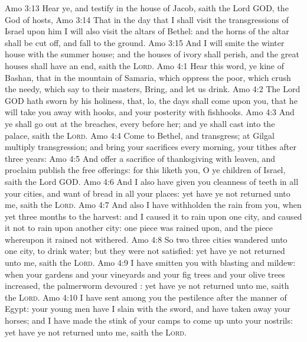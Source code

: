 \vs Amo 3:13 Hear ye, and testify in the house of Jacob, saith the Lord GOD, the God of hosts,
\vs Amo 3:14 That in the day that I shall visit the transgressions of Israel upon him I will also visit the altars of Bethel: and the horns of the altar shall be cut off, and fall to the ground.
\vs Amo 3:15 And I will smite the winter house with the summer house; and the houses of ivory shall perish, and the great houses shall have an end, saith the \textsc{Lord}.
\vs Amo 4:1 Hear this word, ye kine of Bashan, that  in the mountain of Samaria, which oppress the poor, which crush the needy, which say to their masters, Bring, and let us drink.
\vs Amo 4:2 The Lord GOD hath sworn by his holiness, that, lo, the days shall come upon you, that he will take you away with hooks, and your posterity with fishhooks.
\vs Amo 4:3 And ye shall go out at the breaches, every  before her; and ye shall cast  into the palace, saith the \textsc{Lord}.
\vs Amo 4:4 Come to Bethel, and transgress; at Gilgal multiply transgression; and bring your sacrifices every morning,  your tithes after three years:
\vs Amo 4:5 And offer a sacrifice of thanksgiving with leaven, and proclaim  publish the free offerings: for this liketh you, O ye children of Israel, saith the Lord GOD.
\vs Amo 4:6 And I also have given you cleanness of teeth in all your cities, and want of bread in all your places: yet have ye not returned unto me, saith the \textsc{Lord}.
\vs Amo 4:7 And also I have withholden the rain from you, when  yet three months to the harvest: and I caused it to rain upon one city, and caused it not to rain upon another city: one piece was rained upon, and the piece whereupon it rained not withered.
\vs Amo 4:8 So two  three cities wandered unto one city, to drink water; but they were not satisfied: yet have ye not returned unto me, saith the \textsc{Lord}.
\vs Amo 4:9 I have smitten you with blasting and mildew: when your gardens and your vineyards and your fig trees and your olive trees increased, the palmerworm devoured : yet have ye not returned unto me, saith the \textsc{Lord}.
\vs Amo 4:10 I have sent among you the pestilence after the manner of Egypt: your young men have I slain with the sword, and have taken away your horses; and I have made the stink of your camps to come up unto your nostrils: yet have ye not returned unto me, saith the \textsc{Lord}.
